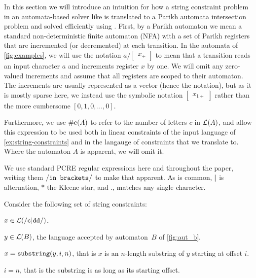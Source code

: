 In this section we will introduce an intuition for how a string constraint
problem in an automata-based solver like \OstrichPlus{} is translated to a
Parikh automata intersection problem and solved efficiently using \Calculus{}.
First, by a Parikh automaton we mean a standard non-deterministic finite
automaton (NFA) with a set of Parikh registers that are incremented (or
decremented) at each transition. In the automata of \cref{fig:examples}, we will
use the notation $a / \begin{bmatrix} x_+ \end{bmatrix}$ to mean that a
transition reads an input character $a$ and increments register $x$ by one. We
will omit any zero-valued increments and assume that all registers are scoped to
their automaton. The increments are usually represented as a vector (hence the
notation), but as it is mostly sparse here, we instead use the symbolic notation
$\begin{bmatrix} x_{1+} \end{bmatrix}$ rather than the more cumbersome $\left[
0, 1,  0 , \ldots, 0 \right]$.

Furthermore, we use $\#\text{c}(A)$ to refer to the number of letters $c$ in
$\operatorname{\mathcal{L}}(A)$, and allow this expression to be used both in linear constraints
of the input language of \cref{ex:string-constraints} and in the langauge of
constraints that we translate to. Where the automaton $A$ is apparent, we will
omit it.

We use standard PCRE regular expressions here and throughout the paper, writing
them $\mathtt{\slash\texttt{in brackets}\slash}$ to make that apparent. As is common,
$\vert{}$ is alternation, $\mathtt{*}$ the Kleene star, and $\mathtt{.}$,
matches any single character.

\begin{example}\label{ex:string-constraints} Consider the following set of
    string constraints:
\begin{constraints}
    \item\label{const:x-in-c-dd} $x \in \operatorname{\mathcal{L}}(\mathtt{\slash c\vert{}dd\slash})$.
    \item\label{const:y-in-b} $y \in \operatorname{\mathcal{L}}(B)$, the language accepted by
    automaton~$B$ of \cref{fig:aut_b}.
    \item\label{const:x-substring} $x = \operatorname{\mathtt{substring}}(y, i, n)$, that is $x$ is an
    $n$-length substring of $y$ starting at offset $i$.
    \item\label{const:more-a-than-b} $i = n$, that is the substring is as long as its starting offset.
\end{constraints}
\end{example}

